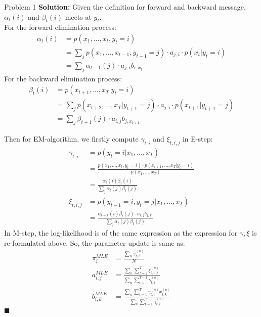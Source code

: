 \documentclass{article}
\newenvironment{solution}                               %
{\textbf{Solution:} }{$\blacksquare$}                   %
\begin{document}
\begin{section}{Problem 1}
        \begin{solution}
            Given the definition for forward and backward message, $\alpha_t(i)$ and $\beta_t(i)$ meets at $y_t$.\\
            For the forward elimination process:
            \begin{align*}
                \alpha_t(i) &= p(x_1, \dots, x_t, y_t=i)\\
                &= \sum_j p(x_1, \dots, x_{t-1}, y_{t-1}=j) \cdot a_{j,i} \cdot p(x_t|y_t=i) \\
                &= \sum_j \alpha_{t-1}(j) \cdot a_{j,i}b_{i,x_t}
            \end{align*}
            For the backward elimination process:
            \begin{align*}
                \beta_t(i) &= p(x_{t+1}, \dots, x_T| y_t=i) \\
                &= \sum_j p(x_{t+2}, \dots, x_T|y_{t+1}=j) \cdot a_{j,i} \cdot p(x_{t+1}|y_{t+1}=j) \\
                &= \sum_j \beta_{t+1}(j) \cdot a_{i,j}b_{j,x_{t+1}}
            \end{align*}

            Then for EM-algorithm, we firstly compute $\gamma_{t,i}$ and $\xi_{t,i,j}$ in E-step:
            \begin{align*}
                \gamma_{t,i} &= p(y_t=i | x_1, \dots, x_T) \\
                &= \frac{p(x_1, \dots, x_t, y_t=i)\cdot p(x_{t+1},\dots,x_T|y_t=i)}{p(x_1, \dots, x_T)} \\
                &= \frac{\alpha_t(i)\beta_t(i)}{\sum_j \alpha_t(j)\beta_t(j)}
                \\
                \xi_{t,i,j} &= p(y_{t-1}=i, y_t=j|x_1, \dots, x_T) \\
                &= \frac{\alpha_{t-1}(i)\beta_t(j)\cdot a_{i,j}b_{j,x_t}}
                    {\sum_j \alpha_t(j)\beta_t(j)}
            \end{align*}
            In M-step, the log-likelihood is of the same expression as the expression for $\gamma, \xi$ is re-formulated above. So, the parameter update is same as:
            \begin{align*}
                \pi_{i}^{MLE} &= \frac{\sum_n \gamma^{(n)}_{t,i}}{N}\\
                    a_{i,j}^{MLE} &= \frac{\sum_n\sum_{t=2}^T \xi^{(n)}_{t,i,j}}{\sum_n\sum_{t=1}^{T-1} \gamma^{(n)}_{t,i}}\\
                    b_{i,k}^{MLE} &=
                                \frac{\sum_n\sum_{t=1}^T \gamma^{(n)}_{t,i} x^{(n)}_{t,k}}
                                {\sum_n\sum_{t=1}^T \gamma^{(n)}_{t,i}}
            \end{align*}
        \end{solution}
    \end{section}
\end{document}
